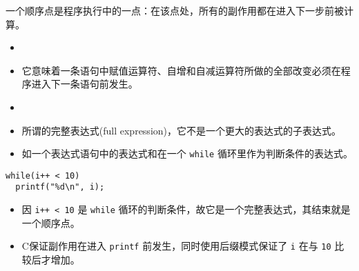 \begin{frame}[fragile]
一个顺序点是程序执行中的一点：在该点处，所有的副作用都在进入下一步前被计算。

\end{frame}

\begin{frame}[fragile]


\begin{itemize}
\item
{} \\[0.1in]
\item[] 它意味着一条语句中赋值运算符、自增和自减运算符所做的全部改变必须在程序进入下一条语句前发生。\\[0.1in]
\item {}\\[0.1in]
\item[] 所谓的完整表达式(full expression)，它不是一个更大的表达式的子表达式。\\[0.1in]
\item[]  如一个表达式语句中的表达式和在一个 \lstinline|while| 循环里作为判断条件的表达式。
\end{itemize}
\end{frame}

\begin{frame}[fragile]

\begin{lstlisting}[backgroundcolor=\color{red!10}]
while(i++ < 10)
  printf("%d\n", i);
\end{lstlisting}

\begin{itemize}
\item 因 \lstinline|i++ < 10| 是 \lstinline|while| 循环的判断条件，故它是一个完整表达式，其结束就是一个顺序点。\\[0.1in] 
\item C保证副作用在进入 \lstinline|printf| 前发生，同时使用后缀模式保证了 \lstinline|i| 在与 \lstinline|10| 比较后才增加。

\end{itemize}

\end{frame}


